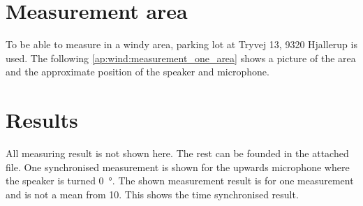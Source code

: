 \section*{Measurement area}
To be able to measure in a windy area, parking lot at Tryvej 13, 9320 Hjallerup is used. The following \autoref{ap:wind:measurement_one_area} shows a picture of the area and the approximate position of the speaker and microphone.


\section*{Results}

All measuring result is not shown here. The rest can be founded in the attached file. One synchronised measurement is shown for the upwards microphone where the speaker is turned \SI{0}{\degree}. The shown measurement result is for one measurement and is not a mean from 10. This shows the time synchronised result. 






